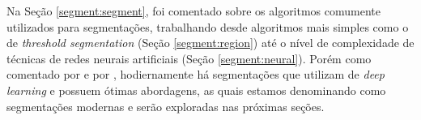 Na Seção \ref{segment:segment}, foi comentado sobre os algoritmos comumente utilizados para segmentações, trabalhando desde algoritmos mais simples como o de \textit{threshold segmentation} (Seção \ref{segment:region}) até o nível de complexidade de técnicas de redes neurais artificiais (Seção \ref{segment:neural}). Porém como comentado por \cite{Ghosh2019} e por \cite{Minaee2021}, hodiernamente há segmentações que utilizam de \textit{deep learning} e possuem ótimas abordagens, as quais estamos denominando como segmentações modernas e serão exploradas nas próximas seções.